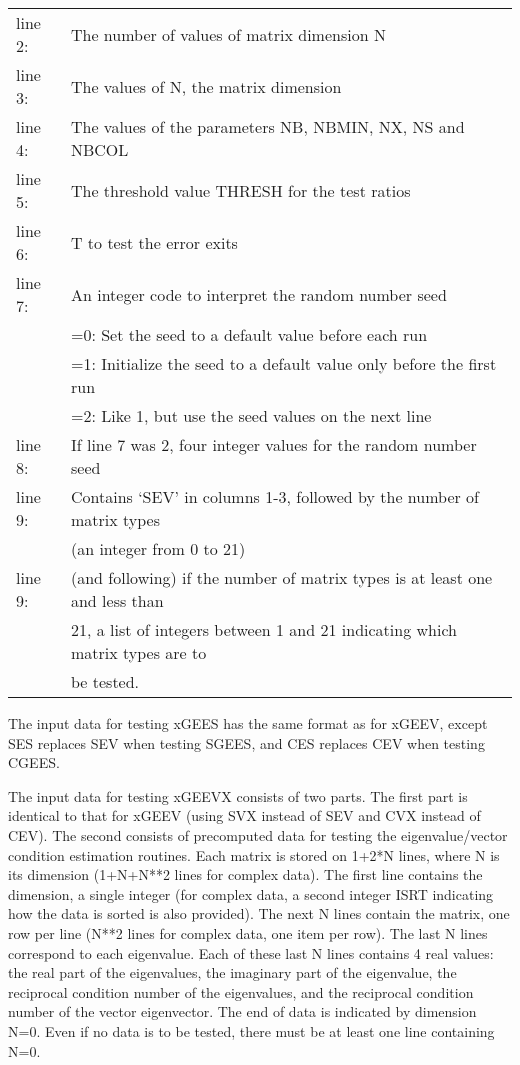 \begin{centering}
\begin{tabular}{ll}
line 2:& The number of values of matrix dimension N \\
line 3:& The values of N, the matrix dimension \\
line 4:& The values of the parameters NB, NBMIN, NX, NS and NBCOL
\\
line 5:& The threshold value THRESH for the test ratios \\
line 6:& T to test the error exits \\
line 7:& An integer code to interpret the random number seed \\
    & =0: Set the seed to a default value before each run \\
    & =1: Initialize the seed to a default value only before the first
run \\
    & =2: Like 1, but use the seed values on the next line \\
line 8:& If line 7 was 2, four integer values for the random number seed
\\
line 9:& Contains `SEV' in columns 1-3, followed by the number of
matrix types
\\
       & (an integer from 0 to 21) \\
line 9:& (and following) if the number of matrix types is at least one
and less
than \\
       & 21, a list of integers between 1 and 21 indicating which matrix
types are to \\
       & be tested.\\
\end{tabular}
\end{centering}

The input data for testing xGEES has the same format as for xGEEV,
except
SES replaces SEV when testing SGEES, and CES replaces CEV when testing
CGEES.

The input data for testing xGEEVX consists of two parts. The first
part is identical to that for xGEEV (using SVX instead of SEV and CVX
instead
of CEV). The second consists of precomputed data for testing the
eigenvalue/vector condition estimation routines.
Each matrix is stored on 1+2*N lines, where N is
its dimension (1+N+N**2 lines for complex data). The first line contains
the
dimension, a single integer (for complex data, a second integer ISRT
indicating how the data is sorted is also provided). The next N lines
contain the matrix, one row per line (N**2 lines for complex data,
one item per row). The last N
lines correspond to each eigenvalue. Each of these
last N lines contains 4 real values: the real part
of the eigenvalues, the imaginary part of the
eigenvalue, the reciprocal condition number of the
eigenvalues, and the reciprocal condition number of
the vector eigenvector.
The end of data is indicated by dimension N=0.
Even if no data is to be tested, there must be
at least one line containing N=0.

